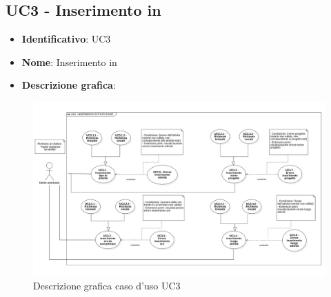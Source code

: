 \subsection{UC3 - Inserimento  in }
\begin{itemize}
    \item \textbf{Identificativo}: UC3 
    \item \textbf{Nome}: Inserimento  in 
    \item \textbf{Descrizione grafica}:
\end{itemize}
\begin{figure}[h]
    \centering
    \includegraphics[scale=0.50]{images/UC3.png} 
    \caption{Descrizione grafica caso d'uso UC3}
\end{figure}

